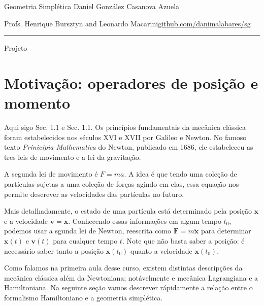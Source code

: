 
\usepackage[style=authortitle-terse,backend=bibtex]{biblatex}




\begin{minipage}{\textwidth}
	\begin{minipage}{1\textwidth}
		Geometria Simpl\'etica \hfill Daniel González Casanova Azuela
		
		{\small Profs. Henrique Bursztyn and Leonardo Macarini\hfill\href{https://github.com/danimalabares/sg}{github.com/danimalabares/sg}}
	\end{minipage}
\end{minipage}\vspace{.2cm}\hrule

\vspace{10pt}
{\huge Projeto}

\tableofcontents

\section{Motivação: operadores de posição e momento}

Aqui sigo \cite{clas} Sec. 1.1 e \cite{qm} Sec. 1.1. Os princípios fundamentais da mecânica clássica foram estabelecidos nos séculos XVI e XVII por Galileo e Newton. No famoso texto \textit{Prinicipia Mathematica} do Newton, publicado em 1686, ele estabeleceu as tres leis de movimento e a lei da gravitação.

A segunda lei de movimento é $F=ma$. A idea  é que tendo uma coleção de partículas sujetas a uma  coleção de forças agindo em elas, essa equação nos permite descrever as velocidades das partículas no futuro.

Mais detalhadamente, o estado de uma partícula está determinado pela posição $\mathbf{x}$ e a velocidade $\mathbf{v}=\dot{\mathbf{x}}$. Conhecendo essas informações em algum tempo $t_0$, podemos usar a sgunda lei de Newton, reescrita como $\mathbf{F}=m\ddot{\mathbf{x}}$ para determinar $\mathbf{x}(t)$ e $\mathbf{v}(t)$ para cualquer tempo $t$. Note que não basta saber a posição: é necessário saber tanto a posição $\mathbf{x}(t_0)$ quanto a velocidade $\dot{\mathbf{x}}(t_0)$.

Como falamos na primeira aula desse curso, existem distintas descripções da mecânica clássica além da Newtoniana; notávelmente e mecânica Lagrangiana e a Hamiltoniana. Na seguinte seção vamos descrever rápidamente a relação entre o formalismo Hamiltoniano e a geometria simplética.


